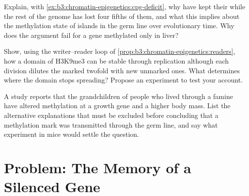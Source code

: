 \begin{exercise}[$\star\star\star$]\label{exo:b3:chromatin-epigenetics:10}
Explain, with \cref{ex:b3:chromatin-epigenetics:cpg-deficit}, why  have kept their  while the rest of the genome has lost
four fifths of them, and what this implies about the methylation state
of islands in the germ line over evolutionary time. Why does the
argument fail for a gene methylated only in liver?
\end{exercise}

\begin{exercise}[$\star\star\star$]\label{exo:b3:chromatin-epigenetics:11}
Show, using the writer--reader loop of
\cref{prop:b3:chromatin-epigenetics:readers}, how a domain of H3K9me3
can be stable through replication although each division dilutes the
marked  twofold with new unmarked ones. What determines where
the domain stops spreading? Propose an experiment to test your account.
\end{exercise}

\begin{exercise}[$\star\star\star$]\label{exo:b3:chromatin-epigenetics:12}
A study reports that the grandchildren of people who lived through a
famine have altered methylation at a growth gene and a higher body
mass. List the alternative explanations that must be excluded before
concluding that a methylation mark was transmitted through the germ
line, and say what experiment in mice would settle the question.
\end{exercise}

\section{Problem: The Memory of a Silenced Gene}

